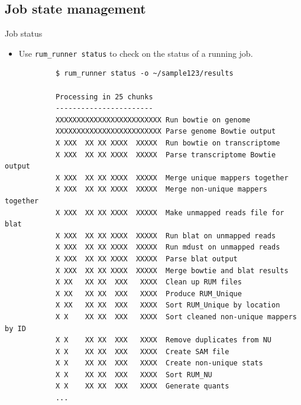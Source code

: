 \documentclass{beamer}
\begin{document}
\subsection{Job state management}

\begin{frame}[fragile]{Job status}
  \begin{itemize}
  \item Use \texttt{rum\_runner status} to check on the status of a
    running job.
  \end{itemize}
  \tiny
\begin{verbatim}
            $ rum_runner status -o ~/sample123/results
            
            Processing in 25 chunks
            -----------------------
            XXXXXXXXXXXXXXXXXXXXXXXXX Run bowtie on genome
            XXXXXXXXXXXXXXXXXXXXXXXXX Parse genome Bowtie output
            X XXX  XX XX XXXX  XXXXX  Run bowtie on transcriptome
            X XXX  XX XX XXXX  XXXXX  Parse transcriptome Bowtie output
            X XXX  XX XX XXXX  XXXXX  Merge unique mappers together
            X XXX  XX XX XXXX  XXXXX  Merge non-unique mappers together
            X XXX  XX XX XXXX  XXXXX  Make unmapped reads file for blat
            X XXX  XX XX XXXX  XXXXX  Run blat on unmapped reads
            X XXX  XX XX XXXX  XXXXX  Run mdust on unmapped reads
            X XXX  XX XX XXXX  XXXXX  Parse blat output
            X XXX  XX XX XXXX  XXXXX  Merge bowtie and blat results
            X XX   XX XX  XXX   XXXX  Clean up RUM files
            X XX   XX XX  XXX   XXXX  Produce RUM_Unique
            X XX   XX XX  XXX   XXXX  Sort RUM_Unique by location
            X X    XX XX  XXX   XXXX  Sort cleaned non-unique mappers by ID
            X X    XX XX  XXX   XXXX  Remove duplicates from NU
            X X    XX XX  XXX   XXXX  Create SAM file
            X X    XX XX  XXX   XXXX  Create non-unique stats
            X X    XX XX  XXX   XXXX  Sort RUM_NU
            X X    XX XX  XXX   XXXX  Generate quants
            ...
\end{verbatim}
\end{frame}
\end{document}
